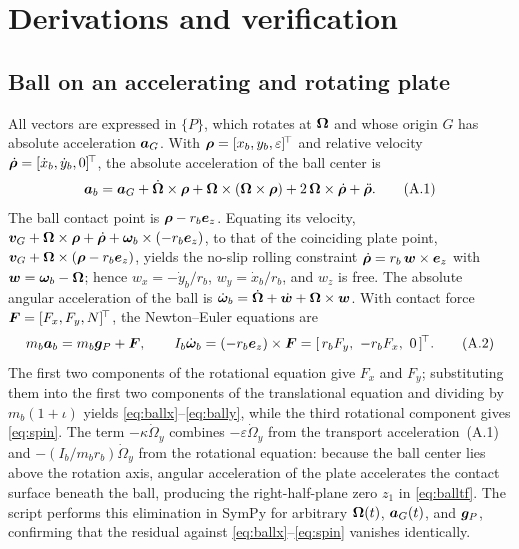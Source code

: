 \section{Derivations and verification}
\label{app:derivations}

\subsection{Ball on an accelerating and rotating plate}
All vectors are expressed in $\{P\}$, which rotates at $\bm{\Omega}$ and whose origin $G$ has absolute acceleration $\bm{a}_G$. With $\bm{\rho}=[x_b,y_b,\varepsilon]^{\!\top}$ and relative velocity $\dot{\bm{\rho}}=[\dot x_b,\dot y_b,0]^{\!\top}$, the absolute acceleration of the ball center is
\begin{equation}
  \bm{a}_b=\bm{a}_G+\dot{\bm{\Omega}}\times\bm{\rho}+\bm{\Omega}\times(\bm{\Omega}\times\bm{\rho})+2\,\bm{\Omega}\times\dot{\bm{\rho}}+\ddot{\bm{\rho}}.
  \tag{A.1}
\end{equation}
The ball contact point is $\bm{\rho}-r_b\bm{e}_z$. Equating its velocity, $\bm{v}_G+\bm{\Omega}\times\bm{\rho}+\dot{\bm{\rho}}+\bm{\omega}_b\times(-r_b\bm{e}_z)$, to that of the coinciding plate point, $\bm{v}_G+\bm{\Omega}\times(\bm{\rho}-r_b\bm{e}_z)$, yields the no-slip rolling constraint $\dot{\bm{\rho}}=r_b\,\bm{w}\times\bm{e}_z$ with $\bm{w}=\bm{\omega}_b-\bm{\Omega}$; hence $w_x=-\dot y_b/r_b$, $w_y=\dot x_b/r_b$, and $w_z$ is free. The absolute angular acceleration of the ball is $\dot{\bm{\omega}}_b=\dot{\bm{\Omega}}+\dot{\bm{w}}+\bm{\Omega}\times\bm{w}$. With contact force $\bm{F}=[F_x,F_y,N]^{\!\top}$, the Newton--Euler equations are
\begin{equation}
  m_b\bm{a}_b=m_b\bm{g}_P+\bm{F},\qquad I_b\dot{\bm{\omega}}_b=(-r_b\bm{e}_z)\times\bm{F}=[\,r_bF_y,\ -r_bF_x,\ 0\,]^{\!\top} .
  \tag{A.2}
\end{equation}
The first two components of the rotational equation give $F_x$ and $F_y$; substituting them into the first two components of the translational equation and dividing by $m_b(1+\iota)$ yields \eqref{eq:ballx}--\eqref{eq:bally}, while the third rotational component gives \eqref{eq:spin}. The term $-\kappa\dot\Omega_y$ combines $-\varepsilon\dot\Omega_y$ from the transport acceleration~(A.1) and $-(I_b/m_br_b)\dot\Omega_y$ from the rotational equation: because the ball center lies above the rotation axis, angular acceleration of the plate accelerates the contact surface beneath the ball, producing the right-half-plane zero $z_1$ in \eqref{eq:balltf}. The script  performs this elimination in SymPy for arbitrary $\bm{\Omega}(t)$, $\bm{a}_G(t)$, and $\bm{g}_P$, confirming that the residual against \eqref{eq:ballx}--\eqref{eq:spin} vanishes identically.


